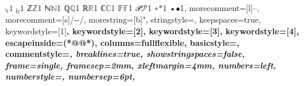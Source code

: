 {    {ᵢ}{{\ensuremath{_i}}}1
    {ⱼ}{{\ensuremath{_j}}}1
    {ℤ}{{\ensuremath{\mathbb{Z}}}}1
    {ℕ}{{\ensuremath{\mathbb{N}}}}1
    {ℚ}{{\ensuremath{\mathbb{Q}}}}1
    {ℝ}{{\ensuremath{\mathbb{R}}}}1
    {ℂ}{{\ensuremath{\mathbb{C}}}}1
    {𝔽}{{\ensuremath{\mathbb{F}}}}1
    {𝒫}{{\ensuremath{\mathcal{P}}}}1
    {∗}{{\ensuremath{\ast}}}1
    {•}{{\ensuremath{\bullet}}}1,
  morecomment=[l]{--},
  morecomment=[s]{/-}{-/},
  morestring=[b]",
  stringstyle=\color{stringcolor},
  keepspaces=true,
  keywordstyle=[1]\color{keywordcolor}\bfseries,
  keywordstyle=[2]\color{sortcolor}\bfseries,
  keywordstyle=[3]\color{tacticcolor}\bfseries,
  keywordstyle=[4]\color{errorcolor}\bfseries\underline,
  escapeinside={(*@}{@*)},
  columns=fullflexible,
  basicstyle=\ttfamily\small,
  commentstyle=\color{commentcolor}\itshape,
  breaklines=true,
  showstringspaces=false,
  frame=single,
  framesep=2mm,
  xleftmargin=4mm,
  numbers=left,
  numberstyle=\tiny\color{commentcolor},
  numbersep=6pt,
}

\newcommand{\lean}[1]{\lstinline[language=lean,basicstyle=\ttfamily\normalsize]|#1|}
